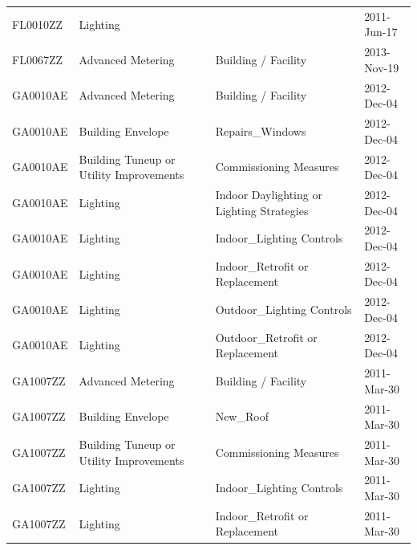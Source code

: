 \documentclass[12pt]{article}
\begin{document}
\begin{longtable}{lp{4cm}p{4cm}p{3cm}}
FL0010ZZ         & Lighting                                &                                           & 2011-Jun-17                   \\
FL0067ZZ         & Advanced Metering                       & Building / Facility                       & 2013-Nov-19                   \\
GA0010AE         & Advanced Metering                       & Building / Facility                       & 2012-Dec-04                   \\
GA0010AE         & Building Envelope                       & Repairs\_Windows                          & 2012-Dec-04                   \\
GA0010AE         & Building Tuneup or Utility Improvements & Commissioning Measures                    & 2012-Dec-04                   \\
GA0010AE         & Lighting                                & Indoor Daylighting or Lighting Strategies & 2012-Dec-04                   \\
GA0010AE         & Lighting                                & Indoor\_Lighting Controls                 & 2012-Dec-04                   \\
GA0010AE         & Lighting                                & Indoor\_Retrofit or Replacement           & 2012-Dec-04                   \\
GA0010AE         & Lighting                                & Outdoor\_Lighting Controls                & 2012-Dec-04                   \\
GA0010AE         & Lighting                                & Outdoor\_Retrofit or Replacement          & 2012-Dec-04                   \\
GA1007ZZ         & Advanced Metering                       & Building / Facility                       & 2011-Mar-30                   \\
GA1007ZZ         & Building Envelope                       & New\_Roof                                 & 2011-Mar-30                   \\
GA1007ZZ         & Building Tuneup or Utility Improvements & Commissioning Measures                    & 2011-Mar-30                   \\
GA1007ZZ         & Lighting                                & Indoor\_Lighting Controls                 & 2011-Mar-30                   \\
GA1007ZZ         & Lighting                                & Indoor\_Retrofit or Replacement           & 2011-Mar-30                   \\

\end{longtable}
\end{document}

